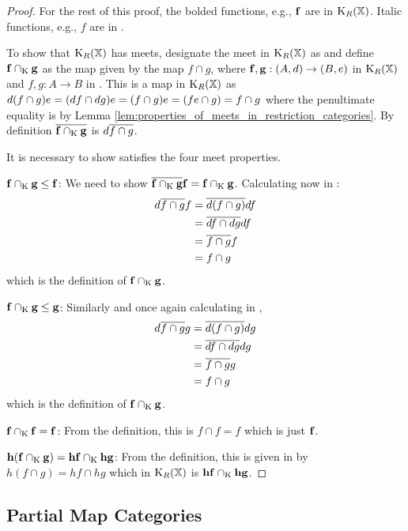 \begin{proof}
For the rest of this proof, the bolded functions, e.g., $\mathbf{f}$ are in $\text{K}_{R}(\mathbb{X})$.
Italic functions, e.g., $f$ are in \X.

To show that $\text{K}_{R}(\mathbb{X})$ has meets,  designate the meet in $\text{K}_{R}(\mathbb{X})$ as \capspl
and define $\mathbf{f} \cap_{\text{K}} \mathbf{g}$ as the map given by the \X map $f \cap g$, where
$\mathbf{f},\mathbf{g}:(A,d)\to(B,e)$ in $\text{K}_{R}(\mathbb{X})$ and $f,g:A\to B$ in \X . This is
a map in $\text{K}_{R}(\mathbb{X})$ as
$d(f \cap g)e = (d\hspace{0.1pt} f \cap d\hspace{0.1pt} g) e = (f \cap g) e = (f e \cap g) = f\cap g$
 where the penultimate equality is by Lemma \ref{lem:properties_of_meets_in_restriction_categories}. By definition
 $\overline{\mathbf{f} \cap_{\text{K}} \mathbf{g} }$ is $d\overline{f\cap g}$.

It is necessary to show \capspl satisfies the four meet properties.
\bi
\item{$\mathbf{f}\cap_{\text{K}} \mathbf{g} \le \mathbf{f}$: } We need to show
$\overline{\mathbf{f} \cap_{\text{K}} \mathbf{g}} \mathbf{f} =  \mathbf{f} \cap_{\text{K}} \mathbf{g}$.  Calculating now in \X:
\begin{align*}
d \overline{f \cap g} f&= \overline{d(f\cap g)} d f\\
& = \overline{df \cap dg} df \\
& = \overline{f \cap g} f \\
& = f \cap g
\end{align*}
which is the definition of $\mathbf{f} \cap_{\text{K}} \mathbf{g}$.
\item{$\mathbf{f}\cap_{\text{K}} \mathbf{g} \le \mathbf{g}$: } Similarly and once again calculating in \X,
\begin{align*}
d \overline{f \cap g} g&= \overline{d(f\cap g)} d g\\
& = \overline{df \cap dg} dg \\
& = \overline{f \cap g} g \\
& = f \cap g
\end{align*}
which is the definition of $\mathbf{f} \cap_{\text{K}} \mathbf{g}$.
\item{$\mathbf{f}\cap_{\text{K}} \mathbf{f} = \mathbf{f}$: } From the definition, this is $f \cap f = f$ which
is just $ \mathbf{f}$.
\item{$\mathbf{h}(\mathbf{f}\cap_{\text{K}} \mathbf{g}) = \mathbf{h}\mathbf{f} \cap_{\text{K}} \mathbf{h}\mathbf{g}$: }
From the definition, this is given in \X by $ h (f \cap g) =
h f \cap h g$ which in $\text{K}_{R}(\mathbb{X})$ is $\mathbf{h}\mathbf{f} \cap_{\text{K}} \mathbf{h}\mathbf{g}$.
\ei
\end{proof}



\subsection{Partial Map Categories} %
\label{sub:partial_map_categories}

